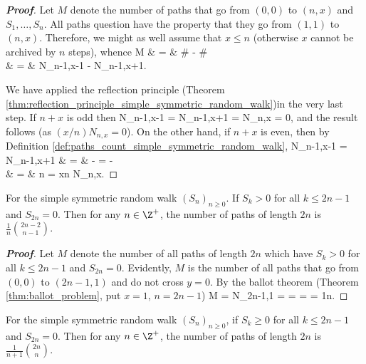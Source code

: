 \begin{proof}[\bf Proof]
Let $M$ denote the number of paths that go from $(0,0)$ to $(n,x)$ and $S_1,\dots,S_n$. All paths question have the property that they go from $(1,1)$ to $(n,x)$. Therefore, we might as well assume that $x\leq n$ (otherwise $x$ cannot be archived by $n$ steps), whence
\beast
M & = & \# - \#\\
& = & N_{n-1,x-1} - N_{n-1,x+1}.
\eeast

We have applied the reflection principle (Theorem \ref{thm:reflection_principle_simple_symmetric_random_walk})in the very last step. If $n+x$ is odd then
\be
N_{n-1,x-1} = N_{n-1,x+1} = N_{n,x} = 0,
\ee
and the result follows (as $(x/n)N_{n,x} = 0$). On the other hand, if $n+x$ is even, then by Definition \ref{def:paths_count_simple_symmetric_random_walk},
\beast
N_{n-1,x-1} = N_{n-1,x+1} & = &  -  =  -  \\
& = & n  = \frac xn N_{n,x}.
\eeast
\end{proof}

\begin{proposition}\label{pro:random_walk_number_paths_greater_than_zero}
For the simple symmetric random walk $(S_n)_{n\geq 0}$. If $S_k > 0$ for all $k\leq 2n-1$ and $S_{2n} = 0$. Then for any $n\in \Z^+$, the number of paths of length $2n$ is $\frac 1{n}\binom{2n-2}{n-1}$.
\end{proposition}

\begin{proof}[\bf Proof]
Let $M$ denote the number of all paths of length $2n$ which have $S_k>0$ for all $k\leq 2n-1$ and $S_{2n}=0$. Evidently, $M$ is the number of all paths that go from $(0,0)$ to $(2n-1,1)$ and do not cross $y=0$. By the ballot theorem (Theorem \ref{thm:ballot_problem}, put $x=1$, $n=2n-1$)
\be
M = N_{2n-1,1} =  =  =  = \frac 1n.
\ee
\end{proof}

\begin{proposition}\label{pro:random_walk_number_paths_greater_equal_than_zero}
For the simple symmetric random walk $(S_n)_{n\geq 0}$, if $S_k \geq 0$ for all $k\leq 2n-1$ and $S_{2n} = 0$. Then for any $n\in \Z^+$, the number of paths of length $2n$ is $\frac 1{n+1}\binom{2n}{n}$.
\end{proposition}

